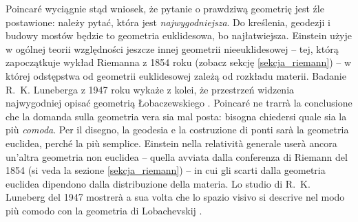 Poincaré wyciągnie stąd wniosek, że pytanie o prawdziwą geometrię jest źle postawione: należy pytać, która jest \emph{najwygodniejsza}. %
Do kreślenia, geodezji i budowy mostów będzie to geometria euklidesowa, bo najłatwiejsza. %
Einstein użyje w ogólnej teorii względności jeszcze innej geometrii nieeuklidesowej -- tej, którą zapoczątkuje wykład Riemanna z 1854 roku (zobacz sekcję \ref{sekcja_riemann}) -- w której odstępstwa od geometrii euklidesowej zależą od rozkładu materii. %
Badanie R.~K. Luneberga z 1947 roku wykaże z kolei, że przestrzeń widzenia najwygodniej opisać geometrią Łobaczewskiego \cite[s. 317]{eves1_1972}. %
Poincaré ne trarrà la conclusione che la domanda sulla geometria vera sia mal posta: bisogna chiedersi quale sia la più \emph{comoda}. %
Per il disegno, la geodesia e la costruzione di ponti sarà la geometria euclidea, perché la più semplice. %
Einstein nella relatività generale userà ancora un'altra geometria non euclidea -- quella avviata dalla conferenza di Riemann del 1854 (si veda la sezione \ref{sekcja_riemann}) -- in cui gli scarti dalla geometria euclidea dipendono dalla distribuzione della materia. %
Lo studio di R.~K. Luneberg del 1947 mostrerà a sua volta che lo spazio visivo si descrive nel modo più comodo con la geometria di Lobachevskij \cite[p. 317]{eves1_1972}. %
%
%
